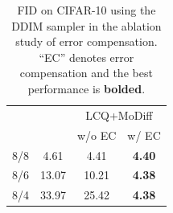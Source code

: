 \begin{table}[t!]
\centering
\small
\caption{FID on CIFAR-10 using the DDIM sampler in the ablation study of error compensation. ``EC'' denotes error compensation and the best performance is \textbf{bolded}.}
\begin{tabular}{c|c|cc}
\toprule
\multirow{2}{*}{\centering {Bits (W/A)}} & \multirow{2}{*}{\centering {LCQ}} & \multicolumn{2}{c}{{LCQ+MoDiff}} \\
& & w/o EC & w/ EC \\
\midrule
8/8 & 4.61 & 4.41 & \textbf{4.40} \\
8/6 & 13.07 & 10.21 & \textbf{4.38} \\
8/4 & 33.97 & 25.42 & \textbf{4.38} \\
\bottomrule
\end{tabular}
\vspace{-0.1in}
\label{tab:error_compensation}
\end{table}